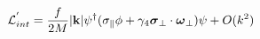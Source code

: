 \begin{equation}
{\cal L}_{int}^{'}= \frac{f}{2M}  |{\bf k}| \psi^{\dag} (\sigma_{\parallel} 
\phi + \gamma_{4} \mbox{\boldmath $\sigma$}_{\perp} \cdot 
\mbox{\boldmath $\omega$}_{\perp}) \psi + O(k^{2}) 
\end{equation}

